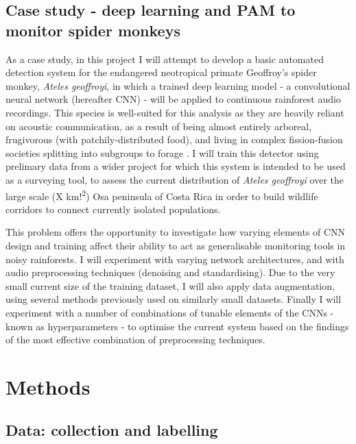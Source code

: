 \documentclass[11pt]{article}
\begin{document}
\subsection{Case study - deep learning and PAM to monitor spider monkeys}

As a case study, in this project I will attempt to develop a basic automated detection system for the endangered neotropical primate Geoffroy’s spider monkey, \textit{Ateles geoffroyi}, in which a trained deep learning model - a convolutional neural network (hereafter CNN) - will be applied to continuous rainforest audio recordings. This species is well-suited for this analysis as they are heavily reliant on acoustic communication, as a result of being almost entirely arboreal, frugivorous (with patchily-distributed food), and living in complex fission-fusion societies splitting into subgroups to forage \citep{ramos2008communication}. I will train this detector using prelimary data from a wider project for which this system is intended to be used as a surveying tool, to assess the current distribution of \textit{Ateles geoffroyi} over the large scale (X km!\textsuperscript{2}) Osa peninsula of Costa Rica in order to build wildlife corridors to connect currently isolated populations. 

This problem offers the opportunity to investigate how varying elements of CNN design and training affect their ability to act as generalisable monitoring tools in noisy rainforests. I will experiment with varying network architectures, and with audio preprocessing techniques (denoising and standardising). Due to the very small current size of the training dataset, I will also apply data augmentation, using several methods previously used on similarly small datasets. Finally I will experiment with a number of combinations of tunable elements of the CNNs - known as hyperparameters - to optimise the current system based on the findings of the most effective combination of preprocessing techniques. 

	
\section{Methods} 

\subsection{Data: collection and labelling}
\end{document}
